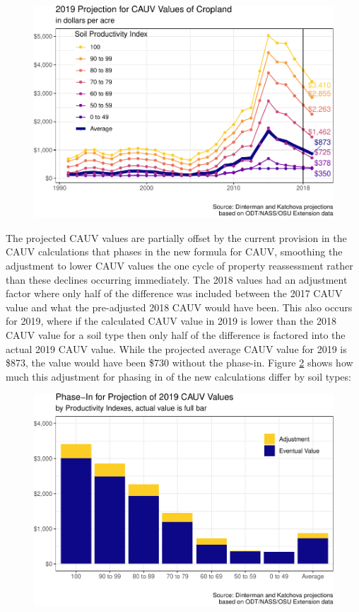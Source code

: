 \documentclass[]{article}
\begin{document}
\begin{figure}[H]
\includegraphics[width=1\linewidth]{4-projections-2019-2020_files/figure-latex/exp-trend-1} \caption{\label{fig:exp-trend}}\label{fig:exp-trend}
\end{figure}

The projected CAUV values are partially offset by the current provision
in the CAUV calculations that phases in the new formula for CAUV,
smoothing the adjustment to lower CAUV values the one cycle of property
reassessment rather than these declines occurring immediately. The 2018
values had an adjustment factor where only half of the difference was
included between the 2017 CAUV value and what the pre-adjusted 2018 CAUV
would have been. This also occurs for 2019, where if the calculated CAUV
value in 2019 is lower than the 2018 CAUV value for a soil type then
only half of the difference is factored into the actual 2019 CAUV value.
While the projected average CAUV value for 2019 is \$873, the value
would have been \$730 without the phase-in. Figure \ref{fig:exp-2019}
shows how much this adjustment for phasing in of the new calculations
differ by soil types:

\begin{figure}[H]
\includegraphics[width=1\linewidth]{4-projections-2019-2020_files/figure-latex/exp-2019-1} \caption{\label{fig:exp-2019}}\label{fig:exp-2019}
\end{figure}
\end{document}
